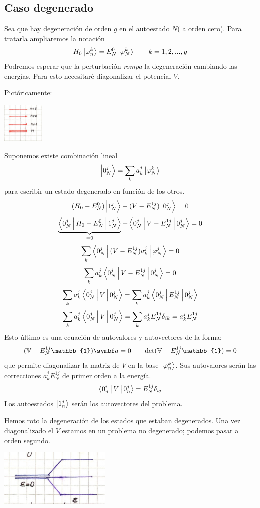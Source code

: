 \documentclass[10pt,oneside]{CBFT_book}
\begin{document}
\subsection{Caso degenerado}

Sea que hay degeneración de orden $g$ en el autoestado $N$( a orden cero).
Para tratarla ampliaremos la notación
\[
	H_0 \Ket{\varphi_n^k} = E_N^0 \Ket{\varphi_N^k} \qquad k=1,2,...,g
\]
Podremos esperar que la perturbación {\it rompa} la degeneración cambiando las energías.
Para esto necesitaré diagonalizar el potencial $V$.

Pictóricamente:

\includegraphics[width=0.15\textwidth]{images/fig_ft2_degeneracion_1.jpg}

Suponemos existe combinación lineal 
\[
	\Ket{0_N^j} = \sum_k a_k^j \Ket{\varphi_N^k}
\]
para escribir un estado degenerado en función de los otros.
\[
	(H_0 - E_N^0 )\Ket{1_N^j} + (V-E_N^{1 j})\Ket{0_N^j} = 0
\]
\[
	\underbrace{\Braket{0_N^j|H_0 - E_N^0|1_N^j}}_{=0} + \Braket{0_N^j|V-E_N^{1 j}|0_N^j} = 0
\]
\[
	\sum_k \Braket{0_N^j|(V-E_N^{1 j})a_k^j|\varphi_N^j} = 0
\]
\[
	\sum_k a_k^j\Braket{0_N^j|V-E_N^{1 j}|0_N^j} = 0
\]
\[
	\sum_k a_k^j\Braket{0_N^j|V|0_N^j} = \sum_k a_k^j\Braket{0_N^j|E_N^{1 j}|0_N^j}
\]
\[
	\sum_k a_k^j\Braket{0_N^j|V|0_N^j} = \sum_k a_k^j E_N^{1 j} \delta_{ik} = a_k^j E_N^{1 j}
\]
Esto último es una ecuación de autovalores y autovectores de la forma:
\[
	(\mathbb{V} - E_N^{1 j} \mathbb{1})\vb{a} =
	0 \qquad \mathrm{det}(\mathbb{V} - E_N^{1 j} \mathbb{1})=0
\]
que permite diagonalizar la matriz de $V$ en la base $\Ket{\varphi_n^k}$. Sus autovalores serán las
correcciones $ a_k^j E_N^{1 j} $ de primer orden a la energía. 
\[
	\Braket{0_n^i|V|0_n^j} = E_N^{1 j} \delta_{ij}
\]
Los autoestados $\Ket{1_n^j}$ serán los autovectores del problema.

Hemos roto la degeneración de los estados que estaban degenerados.
Una vez diagonalizado el $V$ estamos en un problema no degenerado; podemos pasar a orden segundo.

\includegraphics[width=0.4\textwidth]{images/fig_ft2_degeneracion_2.jpg}
\end{document}
